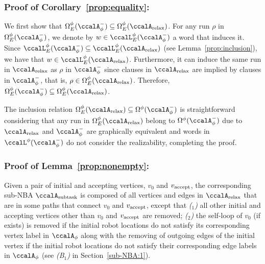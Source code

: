 \documentclass[Afour,sageh,times]{sagej}
\newcounter{mycounter}
\newcommand{\auto}[1]{\ccalA_{\textup{#1}}}
\newcommand{\autop}{\ccalA_{\phi}}
\newcommand{\vertex}[1]{v_{\textup{#1}}}
\begin{document}
{\subsubsection{Proof of Corollary~\ref{prop:equality}:} \label{app:equality}
 We first show that  $\Omega_E^\phi(\autop^-) \subseteq  \Omega_E^\phi(\auto{relax})$. For any run $\rho$ in $\Omega_E^\phi(\autop^-)$, we denote by $w  \in  \ccalL^\phi_E(\autop^-)$ a word that induces it.  Since $\ccalL^\phi_E(\autop^-) \subseteq \ccalL^\phi_E(\auto{relax})$ (see Lemma~\ref{prop:inclusion}), we have that $w \in\ccalL^\phi_E(\auto{relax})$. Furthermore, it can induce the same run in $\auto{relax}$ as $\rho$  in $\autop^-$ since clauses in $\auto{relax}$ are implied by  clauses in $\autop^-$, that is, $\rho \in \Omega_E^\phi(\auto{relax}) $. Therefore, $\Omega_E^\phi(\autop^-) \subseteq  \Omega_E^\phi(\auto{relax})$.

   The inclusion relation $\Omega_E^\phi(\auto{relax}) \subseteq \Omega^\phi(\autop^-)$ is straightforward considering that  any  run in  $\Omega_E^\phi(\auto{relax})$  belong to  $\Omega^\phi(\autop^-)$ due to $\auto{relax}$ and $\autop^-$ are graphically equivalent and words in $\ccalL^\phi(\autop^-)$ do not consider the realizability, completing the proof.

   \subsubsection{Proof of Lemma~\ref{prop:nonempty}:}\label{app:nonempty}
Given a pair of initial and accepting vertices, $v_0$ and $\vertex{accept}$, the corresponding sub-NBA $\auto{subtask}$ is composed of all vertices and edges in $\auto{relax}$ that are in some paths that connect $v_0$ and $\vertex{accept}$, except that {\it ($_1$)} all other initial and accepting vertices other than $v_0$ and $\vertex{accept}$ are removed; {\it ($_2$)} the self-loop of $v_0$ (if exists) is removed if the initial robot locations do not satisfy its corresponding vertex label in $\autop$ along with the removing of  outgoing edges of the initial vertex if the initial robot locations do not satisfy their corresponding edge labels in $\autop$ (see {\it (B$_1$)} in Section~\ref{sub-NBA:1}). %

}
\end{document}
